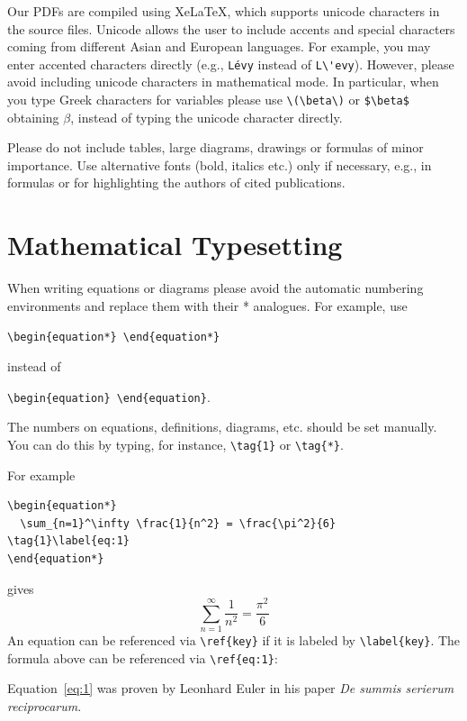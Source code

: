 \documentclass{zbMATH}
\begin{document}
Our PDFs are compiled using XeLaTeX, which supports unicode characters in the source files.
Unicode allows the user to include accents and special characters coming from different Asian and European languages. For example, you may enter accented characters directly (e.g., \verb|Lévy| instead of \verb|L\'evy|). 
However, please avoid including unicode characters in mathematical mode. 
In particular, when you type Greek characters for variables please use \verb|\(\beta\)| or \verb|$\beta$| obtaining \(\beta\), instead of typing the unicode character directly.

Please do not include tables, large diagrams, drawings or formulas of minor importance. Use alternative fonts (bold, italics etc.) only if necessary, e.g., in formulas or for highlighting the authors of cited publications.

\section*{Mathematical Typesetting}

When writing equations or diagrams please avoid the automatic numbering environments and replace them with their * analogues. For example, use 

\verb|\begin{equation*} \end{equation*}|

instead of 

\verb|\begin{equation} \end{equation}|. 

The numbers on equations, definitions, diagrams, etc. should be set manually. You can do this by typing, for instance, \verb|\tag{1}| or \verb|\tag{*}|.

For example
\begin{verbatim}
\begin{equation*}
  \sum_{n=1}^\infty \frac{1}{n^2} = \frac{\pi^2}{6} \tag{1}\label{eq:1}
\end{equation*}
\end{verbatim}
gives
\begin{equation*}
    \sum_{n=1}^\infty \frac{1}{n^2}=\frac{\pi^2}{6} \tag{1}\label{eq:1}
\end{equation*}
An equation can be referenced via \verb|\ref{key}| if it is labeled by \verb|\label{key}|. The formula above can be referenced via \verb|\ref{eq:1}|:

Equation~\ref{eq:1} was proven by Leonhard Euler in his paper \textit{De summis serierum reciprocarum}.
\end{document}
